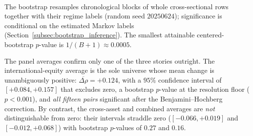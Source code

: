 \begin{table}[htbp]
\centering
\caption{Block-bootstrap significance of the regime-conditional correlation changes. $\overline{\Delta\rho}$ is the average stress-minus-calm pairwise change; the $95\%$ confidence interval and two-sided $p$-value (Equation~\eqref{eq:boot_pvalue}) come from $B = 2{,}000$ circular moving-block bootstrap replicates with block length $L = 21$ days. ``Sig.\ $\uparrow$'' and ``Sig.\ $\downarrow$'' count pairs whose $95\%$ interval lies entirely above or below zero; ``FDR'' counts pairs significant after the per-universe Benjamini--Hochberg correction at $q < 0.05$.}
\label{tab:bootstrap_summary}
\\[0.4em]
{\footnotesize The bootstrap resamples chronological blocks of whole cross-sectional rows together with their regime labels (random seed $20250624$); significance is conditional on the estimated Markov labels (Section~\ref{subsec:bootstrap_inference}). The smallest attainable centered-bootstrap $p$-value is $1/(B+1) \approx 0.0005$.}
\end{table}

The panel averages confirm only one of the three stories outright. The international-equity average is the sole universe whose mean change is unambiguously positive: $\overline{\Delta\rho} = +0.124$, with a $95\%$ confidence interval of $[+0.084, +0.157]$ that excludes zero, a bootstrap $p$-value at the resolution floor ($p < 0.001$), and \emph{all fifteen pairs} significant after the Benjamini--Hochberg correction. By contrast, the cross-asset and combined averages are \emph{not} distinguishable from zero: their intervals straddle zero ($[-0.066, +0.019]$ and $[-0.012, +0.068]$) with bootstrap $p$-values of $0.27$ and $0.16$.

